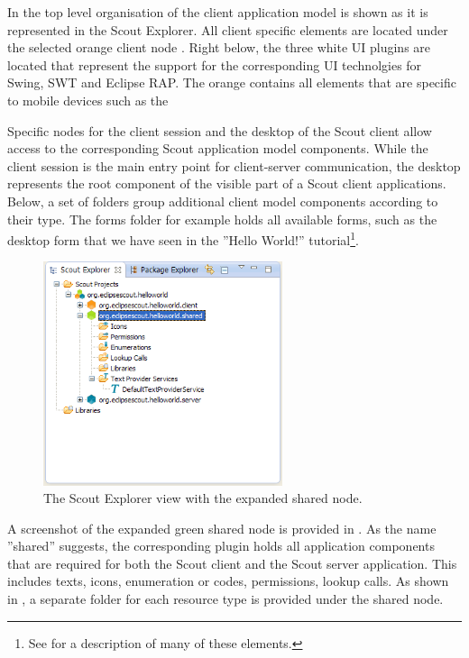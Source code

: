 \documentclass[a4paper,10pt,twoside]{book}
\begin{document}
In  the top level organisation of the client application model is shown as it is represented in the Scout Explorer.
All client specific elements are located under the selected orange client node . 
Right below, the three white UI plugins are located that represent the support for the corresponding UI technolgies for Swing, SWT and Eclipse RAP. 
The orange  contains all elements that are specific to mobile devices such as the 

Specific nodes for the client session and the desktop of the Scout client allow access to the corresponding Scout application model components. 
While the client session is the main entry point for client-server communication, the desktop represents the root component of the visible part of a Scout client applications. 
Below, a set of folders group additional client model components according to their type. 
The forms folder for example holds all available forms, such as the desktop form that we have seen in the ''Hello World!'' tutorial\footnote{
See  for a description of many of these elements.
}. 

\begin{figure}
\includegraphics[width=7cm]{explorer_shared.png} 
\caption{The Scout Explorer view with the expanded shared node.}
\end{figure}

A screenshot of the expanded green shared node  is provided in . 
As the name ''shared'' suggests, the corresponding plugin holds all application components that are required for both the Scout client and the Scout server application. 
This includes texts, icons, enumeration or codes, permissions, lookup calls. 
As shown in , a separate folder for each resource type is provided under the shared node.
 
\end{document}
